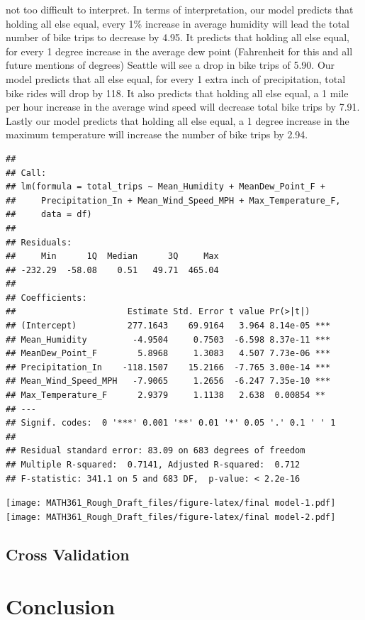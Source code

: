 \documentclass[
]{article}
\begin{document}
not too difficult to interpret. In terms of interpretation, our model
predicts that holding all else equal, every 1\% increase in average
humidity will lead the total number of bike trips to decrease by 4.95.
It predicts that holding all else equal, for every 1 degree increase in
the average dew point (Fahrenheit for this and all future mentions of
degrees) Seattle will see a drop in bike trips of 5.90. Our model
predicts that all else equal, for every 1 extra inch of precipitation,
total bike rides will drop by 118. It also predicts that holding all
else equal, a 1 mile per hour increase in the average wind speed will
decrease total bike trips by 7.91. Lastly our model predicts that
holding all else equal, a 1 degree increase in the maximum temperature
will increase the number of bike trips by 2.94.

\begin{verbatim}
## 
## Call:
## lm(formula = total_trips ~ Mean_Humidity + MeanDew_Point_F + 
##     Precipitation_In + Mean_Wind_Speed_MPH + Max_Temperature_F, 
##     data = df)
## 
## Residuals:
##     Min      1Q  Median      3Q     Max 
## -232.29  -58.08    0.51   49.71  465.04 
## 
## Coefficients:
##                      Estimate Std. Error t value Pr(>|t|)    
## (Intercept)          277.1643    69.9164   3.964 8.14e-05 ***
## Mean_Humidity         -4.9504     0.7503  -6.598 8.37e-11 ***
## MeanDew_Point_F        5.8968     1.3083   4.507 7.73e-06 ***
## Precipitation_In    -118.1507    15.2166  -7.765 3.00e-14 ***
## Mean_Wind_Speed_MPH   -7.9065     1.2656  -6.247 7.35e-10 ***
## Max_Temperature_F      2.9379     1.1138   2.638  0.00854 ** 
## ---
## Signif. codes:  0 '***' 0.001 '**' 0.01 '*' 0.05 '.' 0.1 ' ' 1
## 
## Residual standard error: 83.09 on 683 degrees of freedom
## Multiple R-squared:  0.7141, Adjusted R-squared:  0.712 
## F-statistic: 341.1 on 5 and 683 DF,  p-value: < 2.2e-16
\end{verbatim}

\texttt{[image: MATH361\_Rough\_Draft\_files/figure-latex/final model-1.pdf]}
\texttt{[image: MATH361\_Rough\_Draft\_files/figure-latex/final model-2.pdf]}

\subsection{Cross Validation}\label{cross-validation}

\section{Conclusion}\label{conclusion}
\end{document}
